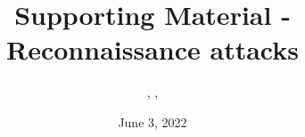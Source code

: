 \documentclass{../../extra/styles/SecureRole}
\title{Supporting Material - Reconnaissance attacks}
\author{\Ba, \Wi, \Zm}
\date{June 3, 2022}
\begin{document}
\makecover
\newpage

\tableofcontents
\newpage



\end{document}
